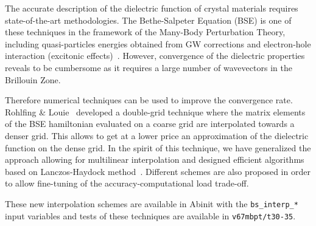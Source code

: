The accurate description of the dielectric function of crystal materials
requires state-of-the-art methodologies. The Bethe-Salpeter Equation (BSE) is
one of these techniques in the framework of the Many-Body Perturbation Theory,
including quasi-particles energies obtained from GW corrections and
electron-hole interaction (excitonic effects)~\cite{Onida2002}.
However, convergence of the dielectric properties reveals to be cumbersome as it 
requires a large number of wavevectors in the Brillouin Zone.

Therefore numerical techniques can be used to improve the convergence rate.
Rohlfing \& Louie~\cite{Rohlfing2000} developed a double-grid technique where 
the matrix elements of the BSE hamiltonian evaluated on a coarse grid are 
interpolated towards a denser grid. This allows to get at a lower price an 
approximation of the dielectric function on the dense grid.
In the spirit of this technique, we have generalized the
approach allowing for multilinear interpolation and designed 
efficient algorithms based on Lanczos-Haydock method~\cite{Gillet2015}.
Different schemes are also proposed in order to allow fine-tuning of the 
accuracy-computational load trade-off.

These new interpolation schemes are available in Abinit with the 
\texttt{bs\_interp\_*}
input variables and tests of these techniques are available in
\texttt{v67mbpt/t30-35}.